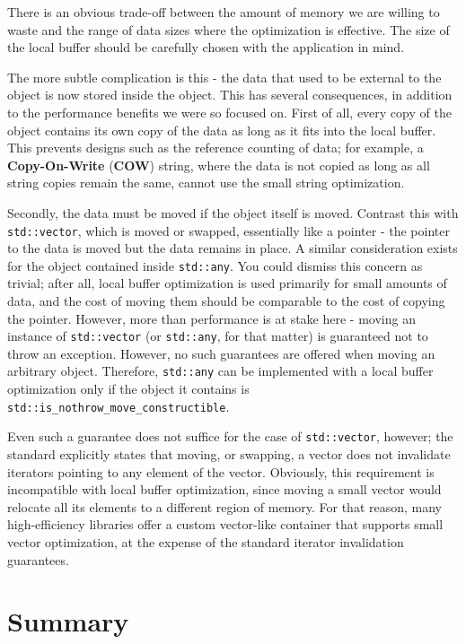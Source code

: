 There is an obvious trade-off between the amount of memory we are willing to waste and the range of data sizes where the optimization is effective. The size of the local buffer should be carefully chosen with the application in mind.

The more subtle complication is this - the data that used to be external to the object is now stored inside the object. This has several consequences, in addition to the performance benefits we were so focused on. First of all, every copy of the object contains its own copy of the data as long as it fits into the local buffer. This prevents designs such as the reference counting of data; for example, a \textbf{Copy-On-Write} (\textbf{COW}) string, where the data is not copied as long as all string copies remain the same, cannot use the small string optimization.

Secondly, the data must be moved if the object itself is moved. Contrast this with \texttt{std::vector}, which is moved or swapped, essentially like a pointer - the pointer to the data is moved but the data remains in place. A similar consideration exists for the object contained inside \texttt{std::any}. You could dismiss this concern as trivial; after all, local buffer optimization is used primarily for small amounts of data, and the cost of moving them should be comparable to the cost of copying the pointer. However, more than performance is at stake here - moving an instance of \texttt{std::vector} (or \texttt{std::any}, for that matter) is guaranteed not to throw an exception. However, no such guarantees are offered when moving an arbitrary object. Therefore, \texttt{std::any} can be implemented with a local buffer optimization only if the object it contains is \texttt{std::is\_nothrow\_move\_constructible}.

Even such a guarantee does not suffice for the case of \texttt{std::vector}, however; the standard explicitly states that moving, or swapping, a vector does not invalidate iterators pointing to any element of the vector. Obviously, this requirement is incompatible with local buffer optimization, since moving a small vector would relocate all its elements to a different region of memory. For that reason, many high-efficiency libraries offer a custom vector-like container that supports small vector optimization, at the expense of the standard iterator invalidation guarantees.

\section{Summary}

